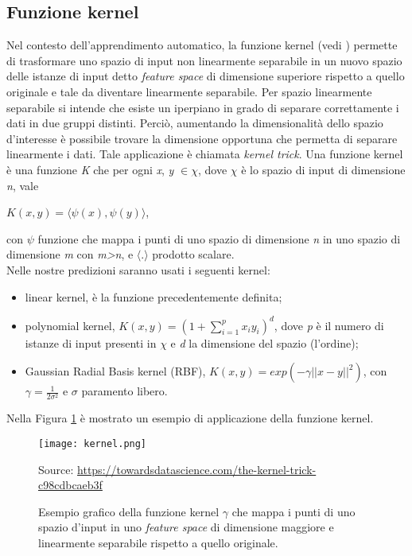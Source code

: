 \subsection{Funzione kernel}
Nel contesto dell'apprendimento automatico, la funzione kernel (vedi \textit{\cite{kernel}}) permette di trasformare uno spazio di input non linearmente separabile in un nuovo spazio delle istanze di input detto \emph{feature space} di dimensione superiore rispetto a quello originale e tale da diventare linearmente separabile. Per spazio linearmente separabile si intende che esiste un iperpiano in grado di separare correttamente i dati in due gruppi distinti. Perciò, aumentando la dimensionalità dello spazio d'interesse è possibile trovare la dimensione opportuna che permetta di separare linearmente i dati. Tale applicazione è chiamata \emph{kernel trick}. Una funzione kernel è una funzione \emph{K} che per ogni \emph{x}, \emph{y} $\in \chi$, dove $\chi$ è lo spazio di input di dimensione \emph{n}, vale 
\begin{center}
	$K(x,y) =  \langle\psi(x),\psi(y)\rangle $,
\end{center}
con $\psi$ funzione che mappa i punti di uno spazio di dimensione \emph{n} in uno spazio di dimensione \emph{m} con \emph{m>n}, e $\langle . \rangle$ prodotto scalare.\\
Nelle nostre predizioni saranno usati i seguenti kernel:
\begin{itemize}
	\item linear kernel, è la funzione precedentemente definita;
	\item polynomial kernel, $K(x,y) =  \left(1 + \sum_{i = 1}^{p}x_iy_i\right)^{d} $, dove \emph{p} è il numero di istanze di input presenti in $\chi$ e \emph{d} la dimensione del spazio (l'ordine);
	\item Gaussian Radial Basis kernel (RBF), $K(x,y) = exp(-\gamma||x-y||^2) $, con $\gamma=\frac{1}{2\sigma^2}$ e $\sigma$ paramento libero. 
\end{itemize}

Nella Figura \ref{fig:kernel} è mostrato un esempio di applicazione della funzione kernel.\\

\begin{figure}[h]
	\begin{center}
		\texttt{[image: kernel.png]}
		\caption{Esempio grafico della funzione kernel $\gamma$ che mappa i punti di uno spazio d'input in uno \emph{feature space} di dimensione maggiore e linearmente separabile rispetto a quello originale.
		} 
		Source: \url{https://towardsdatascience.com/the-kernel-trick-c98cdbcaeb3f}\label{fig:kernel}
	\end{center}
\end{figure}

